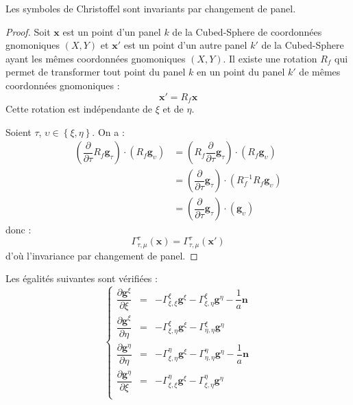 \begin{proposition}
Les symboles de Christoffel sont invariants par changement de panel.
\end{proposition}

\begin{proof}
Soit $\mathbf{x}$ est un point d'un panel $k$ de la Cubed-Sphere de coordonnées gnomoniques $(X,Y)$ et $\mathbf{x}'$ est un point d'un autre panel $k'$ de la Cubed-Sphere ayant les mêmes coordonnées gnomoniques $(X,Y)$. Il existe une rotation $R_f$ qui permet de transformer tout point du panel $k$ en un point du panel $k'$ de mêmes coordonnées gnomoniques :
\begin{equation}
\mathbf{x}' = R_f \mathbf{x}
\end{equation}
Cette rotation est indépendante de $\xi$ et de $\eta$.

Soient $\tau$, $\upsilon \in \left\lbrace \xi, \eta \right\rbrace$. On a :
\begin{align*}
\left( \dfrac{\partial}{\partial \tau}  R_f \mathbf{g}_{\tau} \right) \cdot \left( R_f \mathbf{g}_{\upsilon} \right) & = \left( R_f \dfrac{\partial}{\partial \tau}   \mathbf{g}_{\tau} \right) \cdot \left( R_f \mathbf{g}_{\upsilon} \right)\\
	& =  \left( \dfrac{\partial}{\partial \tau}  \mathbf{g}_{\tau} \right) \cdot \left( R_f^{-1} R_f \mathbf{g}_{\upsilon} \right)\\
	& =  \left( \dfrac{\partial}{\partial \tau}  \mathbf{g}_{\tau} \right) \cdot \left( \mathbf{g}_{\upsilon} \right)
\end{align*}
donc :
\begin{equation}
\Gamma_{\tau, \mu}^{\tau}(\mathbf{x})=\Gamma_{\tau, \mu}^{\tau}(\mathbf{x}')
\end{equation}
d'où l'invariance par changement de panel.
\end{proof}

\begin{proposition}
Les égalités suivantes sont vérifiées :
\begin{equation}
\left\lbrace
\begin{array}{rcl}
\dfrac{\partial \mathbf{g}^{\xi}}{\partial \xi} & = & - \Gamma_{\xi, \xi}^{\xi} \mathbf{g}^{\xi} - \Gamma_{\xi, \eta}^{\xi} \mathbf{g}^{\eta}- \dfrac{1}{a} \mathbf{n}\\

\dfrac{\partial \mathbf{g}^{\xi}}{\partial \eta} & = & - \Gamma_{\xi, \eta}^{\xi} \mathbf{g}^{\xi} - \Gamma_{\eta, \eta}^{\xi} \mathbf{g}^{\eta}\\

\dfrac{\partial \mathbf{g}^{\eta}}{\partial \eta} & = & - \Gamma_{\xi, \eta}^{\eta} \mathbf{g}^{\xi} - \Gamma_{\eta, \eta}^{\eta} \mathbf{g}^{\eta}- \dfrac{1}{a} \mathbf{n}\\

\dfrac{\partial \mathbf{g}^{\eta}}{\partial \xi} & = & - \Gamma_{\xi, \xi}^{\eta} \mathbf{g}^{\xi} - \Gamma_{\xi, \eta}^{\eta} \mathbf{g}^{\eta}\\
\end{array}
\right.
\end{equation}
\end{proposition}

